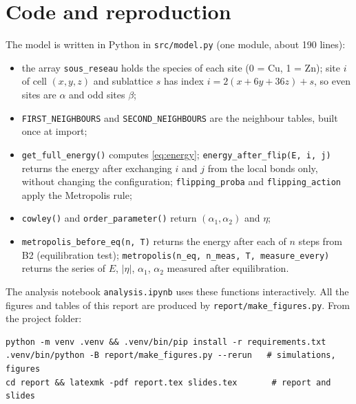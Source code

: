 \documentclass[11pt,a4paper]{article}
\begin{document}
\section{Code and reproduction}
\label{app:code}

The model is written in Python in \texttt{src/model.py} (one module, about 190 lines):
\begin{itemize}\setlength{\itemsep}{0pt}
  \item the array \texttt{sous\_reseau} holds the species of each site (0 = Cu, 1 = Zn); site $i$ of cell $(x,y,z)$ and sublattice $s$ has index $i = 2(x+6y+36z)+s$, so even sites are $\alpha$ and odd sites $\beta$;
  \item \texttt{FIRST\_NEIGHBOURS} and \texttt{SECOND\_NEIGHBOURS} are the neighbour tables, built once at import;
  \item \texttt{get\_full\_energy()} computes \cref{eq:energy}; \texttt{energy\_after\_flip(E, i, j)} returns the energy after exchanging $i$ and $j$ from the local bonds only, without changing the configuration; \texttt{flipping\_proba} and \texttt{flipping\_action} apply the Metropolis rule;
  \item \texttt{cowley()} and \texttt{order\_parameter()} return $(\alpha_1,\alpha_2)$ and $\eta$;
  \item \texttt{metropolis\_before\_eq(n, T)} returns the energy after each of $n$ steps from B2 (equilibration test); \texttt{metropolis(n\_eq, n\_meas, T, measure\_every)} returns the series of $E$, $|\eta|$, $\alpha_1$, $\alpha_2$ measured after equilibration.
\end{itemize}
The analysis notebook \texttt{analysis.ipynb} uses these functions interactively.
All the figures and tables of this report are produced by \texttt{report/make\_figures.py}.
From the project folder:
\begin{verbatim}
python -m venv .venv && .venv/bin/pip install -r requirements.txt
.venv/bin/python -B report/make_figures.py --rerun   # simulations, figures
cd report && latexmk -pdf report.tex slides.tex       # report and slides
\end{verbatim}
\end{document}

